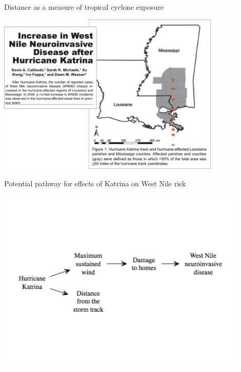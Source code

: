 \documentclass[ignorenonframetext,]{beamer}
\begin{document}
\begin{frame}{Distance as a measure of tropical cyclone exposure}

\begin{center}\includegraphics[width=0.8\textwidth]{katrina_west_nile} \end{center}

\end{frame}

\begin{frame}{Potential pathway for effects of Katrina on West Nile
risk}

\begin{center}\includegraphics[width=0.9\textwidth]{causal_wind} \end{center}

\end{frame}
\end{document}
